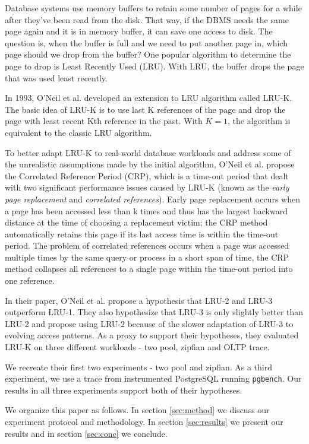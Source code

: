 Database systems use memory buffers to retain some number of pages for a while after they've been read from the disk. That way, if the DBMS needs the same page again and it is in memory buffer, it can save one access to disk. The question is, when the buffer is full and we need to put another page in, which page should we drop from the buffer? One popular algorithm to determine the page to drop is Least Recently Used (LRU). With LRU, the buffer drops the page that was used least recently.

In 1993, O'Neil et al. \cite{lruk} developed an extension to LRU algorithm called LRU-K. The basic idea of LRU-K is to use last K references of the page and drop the page with least recent Kth reference in the past. With $K = 1$, the algorithm is equivalent to the classic LRU algorithm.

To better adapt LRU-K to real-world database workloads and address some of the unrealistic assumptions made by the initial algorithm, O'Neil et al. propose the Correlated Reference Period (CRP), which is a time-out period that dealt with two significant performance issues caused by LRU-K (known as the \emph{early page replacement} and \emph{correlated references}). Early page replacement occurs when a page has been accessed less than k times and thus has the largest backward distance at the time of choosing a replacement victim; the CRP method automatically retains this page if its last access time is within the time-out period. The problem of correlated references occurs when a page was accessed multiple times by the same query or process in a short span of time, the CRP method collapses all references to a single page within the time-out period into one reference.

In their paper, O'Neil et al. propose a hypothesis that LRU-2 and LRU-3 outperform LRU-1. They also hypothesize that LRU-3 is only slightly better than LRU-2 and propose using LRU-2 because of the slower adaptation of LRU-3 to evolving access patterns. As a proxy to support their hypotheses, they evaluated LRU-K on three different workloads - two pool, zipfian and OLTP trace.

We recreate their first two experiments - two pool and zipfian. As a third experiment, we use a trace from instrumented PostgreSQL running \texttt{pgbench}. Our results in all three experiments support both of their hypotheses.

We organize this paper as follows. In section \ref{sec:method} we discuss our experiment protocol and methodology. In section \ref{sec:results} we present our results and in section \ref{sec:conc} we conclude.
